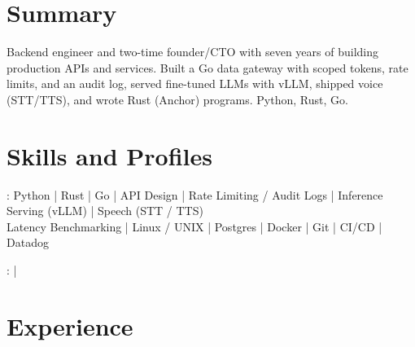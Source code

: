\documentclass[print]{jack-resume}
\begin{document}
\pagecolor{darkmodeBackground}


\begin{minipage}[t][1cm][t]{.03\textwidth}
    \hfill
\end{minipage}

\section{Summary}
Backend engineer and two-time founder/CTO with seven years of building production APIs and services. Built a Go data gateway with scoped tokens, rate limits, and an audit log, served fine-tuned LLMs with vLLM, shipped voice (STT/TTS), and wrote Rust (Anchor) programs. Python, Rust, Go.
\sectionsep

\section{Skills and Profiles}
:
Python \hfill | \hfill
Rust \hfill | \hfill
Go \hfill | \hfill
API Design \hfill | \hfill
Rate Limiting / Audit Logs \hfill | \hfill
Inference Serving (vLLM) \hfill | \hfill
Speech (STT / TTS) \\
\hspace{1.0cm} Latency Benchmarking \hfill | \hfill
Linux / UNIX \hfill | \hfill
Postgres \hfill | \hfill
Docker \hfill | \hfill
Git \hfill | \hfill
CI/CD \hfill | \hfill
Datadog \\

\raggedright{
    :
      \href{https://www.linkedin.com/in/jack-sturtevant/}{ \ExternalLink} |
     \href{https://github.com/jacksturt}{ \ExternalLink}}

\section{Experience}
\end{document}
